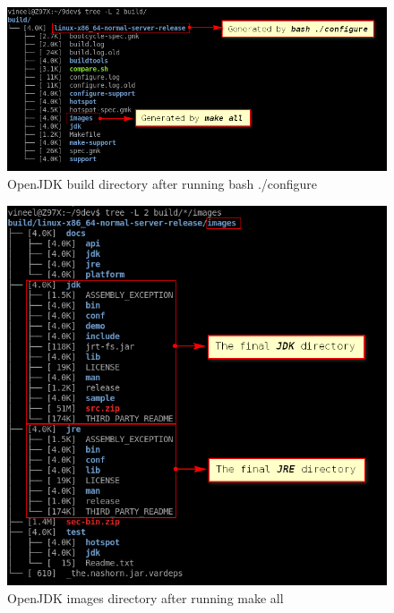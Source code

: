 \documentclass{article}
\begin{document}
\begin{figure}[H]
\centering
\includegraphics[width=\textwidth]{OpenJDK-2.png}
\caption{OpenJDK build directory after running bash ./configure}
\end{figure}

\begin{figure}[H]
\centering
\includegraphics[width=\textwidth]{OpenJDK-3.png}
\caption{OpenJDK images directory after running make all}
\end{figure}
\end{document}
